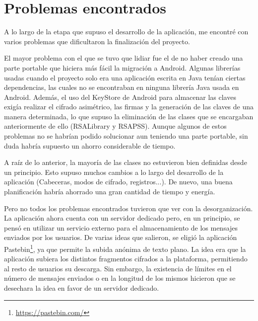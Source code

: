 
\section{Problemas encontrados}

A lo largo de la etapa que supuso el desarrollo de la aplicación, me encontré
con varios problemas que dificultaron la finalización del proyecto.

El mayor problema con el que se tuvo que lidiar fue el de no haber creado una
parte portable que hiciera más fácil la migración a Android. Algunas librerías
usadas cuando el proyecto solo era una aplicación escrita en Java tenían ciertas
dependencias, las cuales no se encontraban en ninguna librería Java usada en
Android. Además, el uso del KeyStore de Android para almacenar las claves
exigía realizar el cifrado asimétrico, las firmas y la generación de las claves
de una manera determinada, lo que supuso la eliminación de las clases que se
encargaban anteriormente de ello (RSALibrary y RSAPSS). Aunque algunos de estos
problemas no se habrían podido solucionar aun teniendo una parte portable, sin
duda habría supuesto un ahorro considerable de tiempo.

A raíz de lo anterior, la mayoría de las clases no estuvieron bien definidas
desde un principio. Esto supuso muchos cambios a lo largo del desarrollo de la
aplicación (Cabeceras, modos de cifrado, registros...). De nuevo, una buena
planificación habría ahorrado una gran cantidad de tiempo y energía.

Pero no todos los problemas encontrados tuvieron que ver con la desorganización.
La aplicación ahora cuenta con un servidor dedicado pero, en un principio, se
pensó en utilizar un servicio externo para el almacenamiento de los mensajes
enviados por los usuarios. De varias ideas que salieron, se eligió la aplicación
Pastebin\footnote{\url{https://pastebin.com/}}, ya que permite la subida anónima
de texto plano. La idea era que la aplicación subiera los distintos fragmentos
cifrados a la plataforma, permitiendo al resto de usuarios su descarga. Sin
embargo, la existencia de límites en el número de mensajes enviados o en la
longitud de los mismos hicieron que se desechara la idea en favor de un
servidor dedicado.
